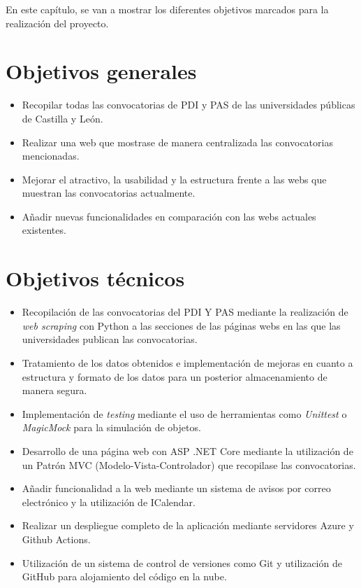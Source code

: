 En este capítulo, se van a mostrar los diferentes objetivos marcados para la realización del proyecto.
\section{Objetivos generales}
\begin{itemize}
    \item Recopilar todas las convocatorias de PDI y PAS de las universidades públicas de Castilla y León.
    \item Realizar una web que mostrase de manera centralizada las convocatorias mencionadas.
    \item Mejorar el atractivo, la usabilidad y la estructura frente a las webs que muestran las convocatorias actualmente.
    \item Añadir nuevas funcionalidades en comparación con las webs actuales existentes.
\end{itemize}
\section{Objetivos técnicos}
\begin{itemize}
    \item Recopilación de las convocatorias del PDI Y PAS mediante la realización de \textit{web scraping} con Python a las secciones de las páginas webs en las que las universidades publican las convocatorias.
    \item Tratamiento de los datos obtenidos e implementación de mejoras en cuanto a estructura y formato de los datos para un posterior almacenamiento de manera segura.
    \item Implementación de \textit{testing} mediante el uso de herramientas como \textit{Unittest} o \textit{MagicMock} para la simulación de objetos.
    \item Desarrollo de una página web con ASP .NET Core mediante la utilización de un Patrón MVC (Modelo-Vista-Controlador) que recopilase las convocatorias. 
    \item Añadir funcionalidad a la web mediante un sistema de avisos por correo electrónico y la utilización de ICalendar.
    \item Realizar un despliegue completo de la aplicación mediante servidores Azure y Github Actions.
    \item Utilización de un sistema de control de versiones como Git y utilización de GitHub para alojamiento del código en la nube.
\end{itemize}

